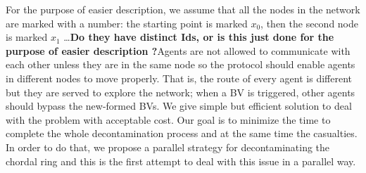 For the purpose of easier description, we assume that all the nodes in the network are marked with a number: the starting point is marked $x_0$, then the second node is marked $x_1$ \dots {\bf Do they have distinct Ids, or is this just done for the purpose of easier description ?}Agents are not allowed to communicate with each other unless they are in the same node so the protocol should enable agents in different nodes to move properly. That is, the route of every agent is different but they are served to explore the network; when a BV is triggered, other agents should bypass the new-formed BVs. We give simple but efficient solution to deal with the problem with acceptable cost. 
Our goal is to minimize the time to complete the whole decontamination process and at the same time the casualties. In order to do that, we propose a parallel strategy for decontaminating the chordal ring and this is the first attempt to deal with this issue in a parallel way. 
%
% 


